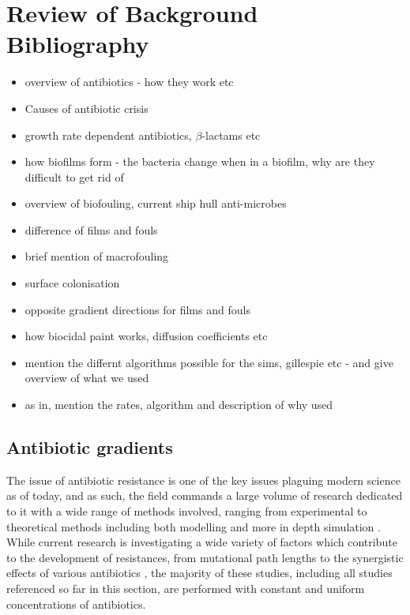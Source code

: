 \documentclass[a4paper,12pt]{article}
\begin{document}
\section{Review of Background Bibliography}

\begin{itemize}
  \item overview of antibiotics - how they work etc
  \item Causes of antibiotic crisis
  \item growth rate dependent antibiotics, $\beta$-lactams etc
  \item how biofilms form - the bacteria change when in a biofilm, why are they difficult to get rid of 
  \item overview of biofouling, current ship hull anti-microbes
  \item difference of films and fouls
  \item brief mention of macrofouling
  \item surface colonisation
  \item opposite gradient directions for films and fouls
  \item how biocidal paint works, diffusion coefficients etc
  \item mention the differnt algorithms possible for the sims, gillespie etc - and give overview of what we used
  \item as in, mention the rates, algorithm and description of why used
 
\end{itemize}

\subsection{Antibiotic gradients}
The issue of antibiotic resistance is one of the key issues plaguing modern science as of today, and as such, the field commands a 
large volume of research dedicated to it with a wide range of methods involved, ranging from experimental to theoretical methods including both modelling and 
more in depth simulation \cite{bioref:chait-interactions, bioref:Wang-treatment-tradeoff, bioref:Torella-optimal-drug-synergy}.  While current research is 
investigating a wide variety of factors which contribute to the development of resistances, from mutational path lengths \cite{bioref:marvig-transmiss-lineage} to 
the synergistic effects of various antibiotics \cite{bioref:Liu-baicalin-synergy}, the majority of these studies, including all studies referenced
so far in this section, are performed with constant and uniform concentrations of antibiotics.
\end{document}
